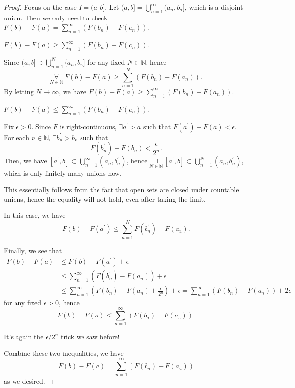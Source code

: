 \begin{proof}
	Focus on the case \(I = (a, b]\). Let \((a, b] = \bigcup_{n=1}^{\infty} (a_{n}, b_{n}]\),
	which is a disjoint union. Then we only need to check \(F(b) - F(a) = \sum\limits_{n=1}^{\infty} \left(F(b_{n}) - F(a_{n})\right)\).
	\begin{claim}
		\(F(b) - F(a) \geq \sum\limits_{n=1}^{\infty} (F(b_{n} ) - F(a_{n} ))\).
	\end{claim}
	\begin{explanation}
		Since \((a, b]\supset \bigcup_{n=1}^{N} (a_{n}, b_{n}]\) for any fixed \(N\in\mathbb{N} \), hence
		\[
			\underset{N\in\mathbb{N} }{\forall}\ F(b) - F(a) \geq \sum\limits_{n=1}^{N} \left(F(b_{n}) - F(a_{n})\right).
		\]
		By letting \(N \to \infty\), we have \(F(b) - F(a) \geq \sum\limits_{n=1}^{\infty} \left(F(b_{n}) - F(a_{n})\right)\).
	\end{explanation}
	\begin{claim}
		\(F(b) - F(a) \leq \sum\limits_{n=1}^{\infty} (F(b_{n} ) - F(a_{n} ))\).
	\end{claim}
	\begin{explanation}
		Fix \(\epsilon >0\). Since \(F\) is right-continuous, \(\exists a ^\prime > a\) such that \(F(a ^\prime ) - F(a) <\epsilon\).
		For each \(n\in\mathbb{N} \), \(\exists b_{n} ^\prime > b_{n}\) such that
		\[
			F(b_{n} ^\prime ) - F(b_{n})<\frac{\epsilon }{2^n}.
		\]
		Then, we have \([a ^\prime , b] \subset \bigcup\limits_{n=1}^{\infty} (a_{n}, b_{n} ^\prime )\), hence
		\(\underset{ N\in\mathbb{N}}{\exists}\ [a ^\prime , b]\subset \bigcup\limits_{n=1}^{N} (a_{n}, b_{n} ^\prime )\),
		which is only finitely many unions now.
		\begin{remark}
			This essentially follows from the fact that open sets are closed under countable unions, hence the equality will not hold, even after taking the limit.
		\end{remark}

		In this case, we have
		\[
			F(b) - F(a ^\prime ) \leq \sum\limits_{n=1}^{N} F(b_{n} ^\prime ) - F(a_{n}).
		\]


		Finally, we see that
		\[
			\begin{split}
				F(b) - F(a)&\leq F(b) - F(a ^\prime )+\epsilon \\
				&\leq \sum\limits_{n=1}^{\infty} \left(F(b_{n} ^\prime ) - F(a_{n})\right) + \epsilon \\
				&\leq \sum\limits_{n=1}^{\infty} \left(F(b_{n}) - F(a_{n}) + \frac{\epsilon }{2^n}\right) + \epsilon
				= \sum\limits_{n=1}^{\infty} \left(F(b_{n}) - F(a_{n})\right) + 2\epsilon
			\end{split}
		\]
		for any fixed \(\epsilon > 0\), hence
		\[
			F(b) - F(a) \leq \sum\limits_{n=1}^{\infty} (F(b_{n}) - F(a_{n})).
		\]
		\begin{remark}
			It's again the \(\epsilon /2^n\) trick we saw before!
		\end{remark}
	\end{explanation}

	Combine these two inequalities, we have
	\[
		F(b) - F(a) = \sum\limits_{n=1}^{\infty} (F(b_{n}) - F(a_{n}))
	\]
	as we desired.
\end{proof}
